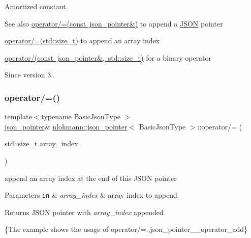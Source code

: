 Amortized constant.

\begin{DoxySeeAlso}{See also}
\mbox{\hyperlink{classnlohmann_1_1json__pointer_a7395bd0af29ac23fd3f21543c935cdfa}{operator/=(const json\+\_\+pointer\&)}} to append a \mbox{\hyperlink{cliente_8cpp_ab6104b89642419db4e355b7b2e40abbe}{J\+S\+ON}} pointer 

\mbox{\hyperlink{classnlohmann_1_1json__pointer_a64c8401529131bad1e486d91d703795f}{operator/=(std\+::size\+\_\+t)}} to append an array index 

\mbox{\hyperlink{classnlohmann_1_1json__pointer_a9f6bc6f4d4668b4e9a19d8b8ac29da4f}{operator/(const json\+\_\+pointer\&, std\+::size\+\_\+t)}} for a binary operator
\end{DoxySeeAlso}
\begin{DoxySince}{Since}
version 3.. 
\end{DoxySince}
\mbox{\label{classnlohmann_1_1json__pointer_a64c8401529131bad1e486d91d703795f}} 
\subsubsection{\texorpdfstring{operator/=()}{operator/=()}\hspace{0.1cm}{\footnotesize\ttfamily [3/3]}}
{\footnotesize\ttfamily template$<$typename Basic\+Json\+Type $>$ \\
\mbox{\hyperlink{classnlohmann_1_1json__pointer}{json\+\_\+pointer}}\& \mbox{\hyperlink{classnlohmann_1_1json__pointer}{nlohmann\+::json\+\_\+pointer}}$<$ Basic\+Json\+Type $>$\+::operator/= (\begin{DoxyParamCaption}\item[{std\+::size\+\_\+t}]{array\+\_\+index }\end{DoxyParamCaption})\hspace{0.3cm}{\ttfamily [inline]}}



append an array index at the end of this J\+S\+ON pointer 


\begin{DoxyParams}[1]{Parameters}
\mbox{\tt in}  & {\em array\+\_\+index} & array index to append \\
\hline
\end{DoxyParams}
\begin{DoxyReturn}{Returns}
J\+S\+ON pointer with {\itshape array\+\_\+index} appended
\end{DoxyReturn}
\{The example shows the usage of {\ttfamily operator/=}.,json\+\_\+pointer\+\_\+\+\_\+operator\+\_\+add\}

